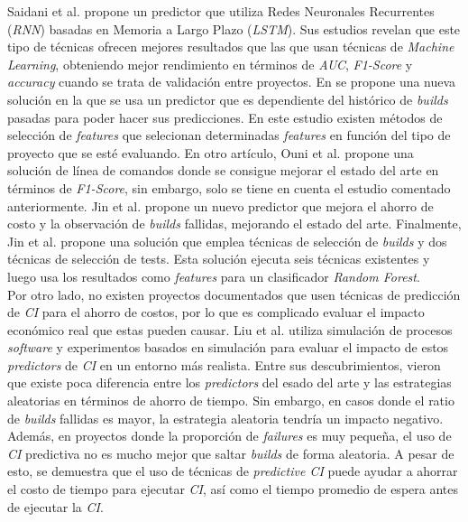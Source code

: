 Saidani et al. \cite{18} propone un predictor que utiliza Redes Neuronales Recurrentes
(\textit{RNN}) basadas en Memoria a Largo Plazo (\textit{LSTM}). Sus estudios revelan que este
tipo de técnicas ofrecen mejores resultados que las que usan técnicas de \textit{Machine
Learning}, obteniendo mejor rendimiento en términos de \textit{AUC}, \textit{F1-Score} y
\textit{accuracy} cuando se trata de validación entre proyectos. En \cite{7} se propone una
nueva solución en la que se usa un predictor que es dependiente del histórico de \textit{builds}
pasadas para poder hacer sus predicciones. En este estudio existen métodos de selección de
\textit{features} que selecionan determinadas \textit{features} en función del tipo de proyecto
que se esté evaluando. En otro artículo, Ouni et al. \cite{17} propone una solución de línea de
comandos donde se consigue mejorar el estado del arte en términos de \textit{F1-Score}, sin
embargo, solo se tiene en cuenta el estudio \cite{8} comentado anteriormente. Jin et al.
\cite{4} propone un nuevo predictor que mejora el ahorro de costo y la observación de
\textit{builds} fallidas, mejorando el estado del arte. Finalmente, Jin et al. \cite{6} propone
una solución que emplea técnicas de selección de \textit{builds} y dos técnicas de selección
de tests. Esta solución ejecuta seis técnicas existentes y luego usa los resultados como
\textit{features} para un clasificador \textit{Random Forest}.\\

Por otro lado, no existen proyectos documentados que usen técnicas de predicción de \textit{CI}
para el ahorro de costos, por lo que es complicado evaluar el impacto económico real que estas
pueden causar. Liu et al. \cite{22} utiliza simulación de procesos \textit{software} y
experimentos basados en simulación para evaluar el impacto de estos \textit{predictors} de
\textit{CI} en un entorno más realista. Entre sus descubrimientos, vieron que existe poca
diferencia entre los \textit{predictors} del esado del arte y las estrategias aleatorias en
términos de ahorro de tiempo. Sin embargo, en casos donde el ratio de \textit{builds} fallidas
es mayor, la estrategia aleatoria tendría un impacto negativo. Además, en proyectos donde la
proporción de \textit{failures} es muy pequeña, el uso de \textit{CI} predictiva no es mucho
mejor que saltar \textit{builds} de forma aleatoria. A pesar de esto, se demuestra que el uso
de técnicas de \textit{predictive CI} puede ayudar a ahorrar el costo de tiempo para ejecutar
\textit{CI}, así como el tiempo promedio de espera antes de ejecutar la \textit{CI}.\\
